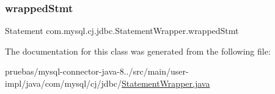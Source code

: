 \subsubsection{\texorpdfstring{wrapped\+Stmt}{wrappedStmt}}
{\footnotesize\ttfamily Statement com.\+mysql.\+cj.\+jdbc.\+Statement\+Wrapper.\+wrapped\+Stmt\hspace{0.3cm}{\ttfamily [protected]}}



The documentation for this class was generated from the following file\+:\begin{DoxyCompactItemize}
\item 
pruebas/mysql-\/connector-\/java-\/8../src/main/user-\/impl/java/com/mysql/cj/jdbc/\mbox{\hyperlink{_statement_wrapper_8java}{Statement\+Wrapper.\+java}}\end{DoxyCompactItemize}
